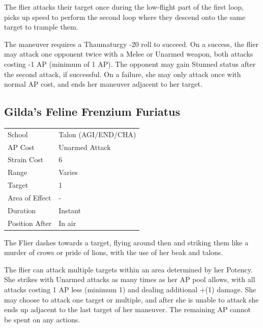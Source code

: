 \documentclass[11pt,a4paper,twocolumn]{book}
\begin{document}
\medskip

The flier attacks their target once during the low-flight part of the first loop, picks up speed to perform the second loop where they descend onto the same target to trample them.

The maneuver requires a Thaumaturgy -20 roll to succeed. On a success, the flier may attack one opponent twice with a Melee or Unarmed weapon, both attacks costing -1 AP (minimum of 1 AP). The opponent may gain Stunned status after the second attack, if successful. On a failure, she may only attack once with normal AP cost, and ends her maneuver adjacent to her target.


\vfill

\subsection*{Gilda's Feline Frenzium Furiatus}
{
	\begin{tabu} to 75mm{| X[l,4] | X[l,7] |}
		\hline
		School 			& Talon (AGI/END/CHA)			\\
        AP Cost	      	& Unarmed Attack 	\\
        Strain Cost     & 6 				\\
        Range     		& Varies 		\\
        Target      	& 1 				\\
        Area of Effect  & - 	 			\\
        Duration     	& Instant 	 		\\
		Position After  & In air 			\\ \hline
	\end{tabu}
		
}

\medskip

The Flier dashes towards a target, flying around then and striking them like a murder of crows or pride of lions, with the use of her beak and talons.

The flier can attack multiple targets within an area determined by her Potency. She strikes with Unarmed attacks as many times as her AP pool allows, with all attacks costing 1 AP less (minimum 1) and dealing additional +(1) damage. She may choose to attack one target or multiple, and after she is unable to attack she ends up adjacent to the last target of her maneuver. The remaining AP cannot be spent on any actions.
\end{document}
